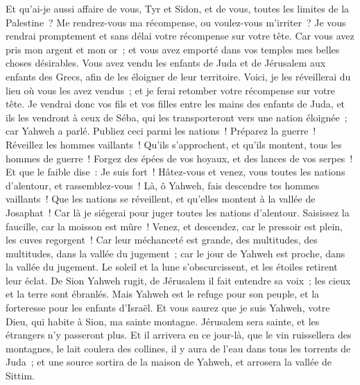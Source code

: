 \begin{multicols}{2}
Et qu'ai-je aussi affaire de vous, Tyr et Sidon, et de vous, toutes les limites de la Palestine~? Me rendrez-vous ma récompense, ou voulez-vous m'irriter~? Je vous rendrai promptement et sans délai votre récompense sur votre tête.
Car vous avez pris mon argent et mon or~; et vous avez emporté dans vos temples mes belles choses désirables.
Vous avez vendu les enfants de Juda et de Jérusalem aux enfants des Grecs, afin de les éloigner de leur territoire.
Voici, je les réveillerai du lieu où vous les avez vendus~; et je ferai retomber votre récompense sur votre tête.
Je vendrai donc vos fils et vos filles entre les mains des enfants de Juda, et ils les vendront à ceux de Séba, qui les transporteront vers une nation éloignée~; car Yahweh a parlé.
Publiez ceci parmi les nations~! Préparez la guerre~! Réveillez les hommes vaillants~! Qu'ils s'approchent, et qu'ils montent, tous les hommes de guerre~!
Forgez des épées de vos hoyaux, et des lances de vos serpes~! Et que le faible dise~: Je suis fort~!
Hâtez-vous et venez, vous toutes les nations d'alentour, et rassemblez-vous~! Là, ô Yahweh, fais descendre tes hommes vaillants~!
Que les nations se réveillent, et qu'elles montent à la vallée de Josaphat~! Car là je siégerai pour juger toutes les nations d'alentour.
Saisissez la faucille, car la moisson est mûre~! Venez, et descendez, car le pressoir est plein, les cuves regorgent~! Car leur méchanceté est grande,
des multitudes, des multitudes, dans la vallée du jugement~; car le jour de Yahweh est proche, dans la vallée du jugement.
Le soleil et la lune s'obscurcissent, et les étoiles retirent leur éclat.
De Sion Yahweh rugit, de Jérusalem il fait entendre sa voix~; les cieux et la terre sont ébranlés. Mais Yahweh est le refuge pour son peuple, et la forteresse pour les enfants d'Israël.
Et vous saurez que je suis Yahweh, votre Dieu, qui habite à Sion, ma sainte montagne. Jérusalem sera sainte, et les étrangers n'y passeront plus.
Et il arrivera en ce jour-là, que le vin ruissellera des montagnes, le lait coulera des collines, il y aura de l'eau dans tous les torrents de Juda~; et une source sortira de la maison de Yahweh, et arrosera la vallée de Sittim.

\end{multicols}
